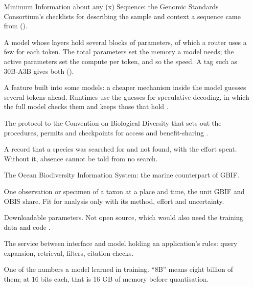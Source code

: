 \begin{description}[itemsep=0.2em]
\item[MIxS] Minimum Information about any (x) Sequence: the Genomic Standards
  Consortium's checklists for describing the sample and context a sequence
  came from ().

\item[Mixture-of-experts (MoE)] A model whose layers hold several blocks of
  parameters, of which a router uses a few for each token. The total
  parameters set the memory a model needs; the active parameters set the
  compute per token, and so the speed. A tag such as 30B-A3B gives both
  ().

\item[Multi-token prediction] A feature built into some models: a cheaper
  mechanism inside the model guesses several tokens ahead. Runtimes use the
  guesses for speculative decoding, in which the full model checks them and
  keeps those that hold \parencite{willison2026qwen38}.

\item[Nagoya Protocol] The protocol to the Convention on Biological Diversity
  that sets out the procedures, permits and checkpoints for access and
  benefit-sharing \parencite{scholz2022dsi}.

\item[Non-detection] A record that a species was searched for and not found,
  with the effort spent. Without it, absence cannot be told from no search.

\item[OBIS] The Ocean Biodiversity Information System: the marine counterpart
  of GBIF.

\item[Occurrence record] One observation or specimen of a taxon at a place and
  time, the unit GBIF and OBIS share. Fit for analysis only with its method,
  effort and uncertainty.

\item[Open weight] Downloadable parameters. Not open source, which would also
  need the training data and code \parencite{hai2026openweight}.

\item[Orchestrator] The service between interface and model holding an
  application's rules: query expansion, retrieval, filters, citation checks.

\item[Parameter] One of the numbers a model learned in training. ``8B'' means
  eight billion of them; at 16 bits each, that is 16 GB of memory before
  quantisation.


\end{description}
